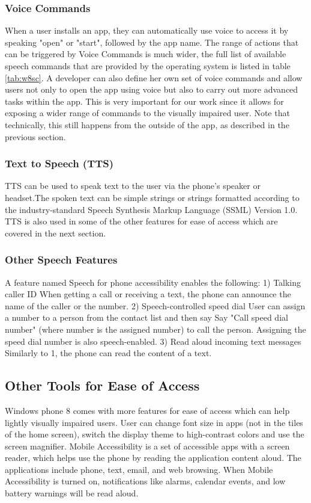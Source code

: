 \subsubsection{Voice Commands}
When a user installs an app, they can automatically use voice to access it by speaking "open" or "start", followed by the app name. The range of actions that can be triggered by Voice Commands is much wider, the full list of available speech commands that are provided by the operating system is listed in table \ref{tab:w8sc}.
A developer can also define her own set of voice commands and allow users not only to open the app using voice but also to carry out more advanced tasks within the app. This is very important for our work since it allows for exposing a wider range of commands to the visually impaired user. Note that technically, this still happens from the outside of the app, as described in the previous section.

\subsubsection{Text to Speech (TTS)}
TTS can be used to speak text to the user via the phone's speaker or headset.The spoken text can be simple strings or strings formatted according to the industry-standard Speech Synthesis Markup Language (SSML) Version 1.0. TTS is also used in some of the other features for ease of access which are covered in the next section.

\subsubsection{Other Speech Features}
A feature named Speech for phone accessibility enables the following:
1)	Talking caller ID
When getting a call or receiving a text, the phone can announce the name of the caller or the number. 
2)	Speech-controlled speed dial
User can assign a number to a person from the contact list and then say Say "Call speed dial number" (where number is the assigned number) to call the person. Assigning the speed dial number is also speech-enabled.
3)	Read aloud incoming text messages
Similarly to 1, the phone can read the content of a text.

\subsection{Other Tools for Ease of Access}
Windows phone 8 comes with more features for ease of access which can help lightly visually impaired users. User can change font size in apps (not in the tiles of the home screen), switch the display theme to high-contrast colors and use the screen magnifier. Mobile Accessibility is a set of accessible apps with a screen reader, which helps use the phone by reading the application content aloud. The applications include phone, text, email, and web browsing. When Mobile Accessibility is turned on, notifications like alarms, calendar events, and low battery warnings will be read aloud. 

\endinput
